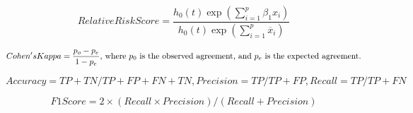 \documentclass[fleqn,10pt]{wlscirep}
\begin{document}
\begin{equation} \label{risk}
Relative Risk Score = \frac{h_{0}(t) \exp \left(\sum_{i=1}^{p} \beta_{1} x_{i}\right)}{h_{0}(t) \exp \left(\sum_{i=1}^{p}\overline{x}_{i}\right)}
\end{equation}

\begin{equation} \label{kappa}
 Cohen's Kappa = \frac{p_{o}-p_{e}}{1-p_{e}} $, where ${p{_0}}$ is the observed agreement, and ${p{_e}}$ is the expected agreement.$
 \end{equation}

\begin{equation} \label{apr}
Accuracy =TP+TN/TP+FP+FN+TN, Precision = TP/TP+FP, Recall = TP/TP+FN
\end{equation}

\begin{equation} \label{F1}
F1 Score = 2\times(Recall\times Precision)/(Recall + Precision)
\end{equation}
\end{document}
